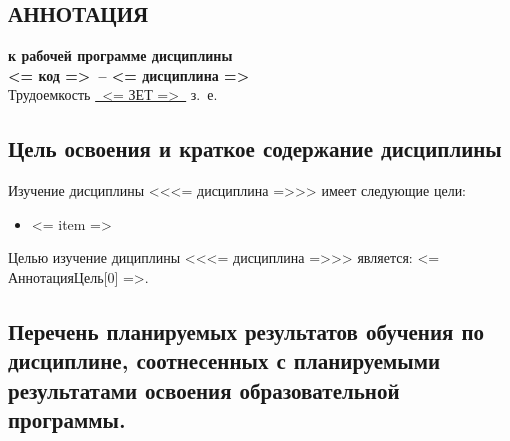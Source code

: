 \documentclass[a4paper,12pt]{article}
\begin{document}
\newpage


\begin{center}
\section{АННОТАЦИЯ}
  {\bf к рабочей программе дисциплины\\
  <= код =>\ -- <= дисциплина =>} \\
  Трудоемкость \uline{~<= ЗЕТ =>~} з.~е.
\end{center}


\subsection{Цель освоения и краткое содержание дисциплины}
  Изучение дисциплины <<<= дисциплина =>>> имеет следующие цели:
  \begin{itemize}%
    \item <= item => %
  \end{itemize}
  Целью изучение дициплины <<<= дисциплина =>>> является: <= АннотацияЦель[0] =>.


\subsection{Перечень планируемых результатов обучения по дисциплине, соотнесенных с планируемыми результатами освоения образовательной программы.}
\end{document}
